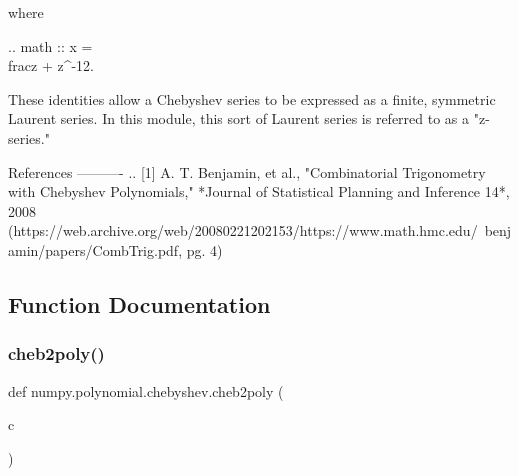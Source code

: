 \begin{DoxyVerb}
where

.. math :: x = \\frac{z + z^{-1}}{2}.

These identities allow a Chebyshev series to be expressed as a finite,
symmetric Laurent series.  In this module, this sort of Laurent series
is referred to as a "z-series."

References
----------
.. [1] A. T. Benjamin, et al., "Combinatorial Trigonometry with Chebyshev
  Polynomials," *Journal of Statistical Planning and Inference 14*, 2008
  (https://web.archive.org/web/20080221202153/https://www.math.hmc.edu/~benjamin/papers/CombTrig.pdf, pg. 4)\end{DoxyVerb}
 

\subsection{Function Documentation}
\mbox{\label{namespacenumpy_1_1polynomial_1_1chebyshev_a5b997d4c0cb4a18d2f283eeb2b30ee83}} 
\subsubsection{\texorpdfstring{cheb2poly()}{cheb2poly()}}
{\footnotesize\ttfamily def numpy.\+polynomial.\+chebyshev.\+cheb2poly (\begin{DoxyParamCaption}\item[{}]{c }\end{DoxyParamCaption})}

